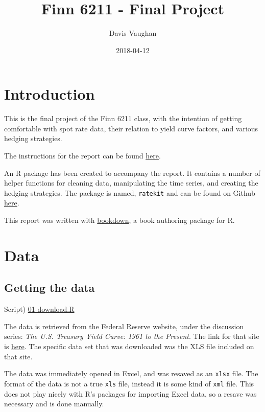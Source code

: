 \documentclass[]{book}
\title{Finn 6211 - Final Project}
\author{Davis Vaughan}
\date{2018-04-12}
\begin{document}
\maketitle

{
\setcounter{tocdepth}{1}
\tableofcontents
}
\hypertarget{titlepage}{%
\chapter{Introduction}\label{titlepage}}

This is the final project of the Finn 6211 class, with the intention of
getting comfortable with spot rate data, their relation to yield curve
factors, and various hedging strategies.

The instructions for the report can be found
\href{./instructions/Hedging_Project_S18.pdf}{here}.

An R package has been created to accompany the report. It contains a
number of helper functions for cleaning data, manipulating the time
series, and creating the hedging strategies. The package is named,
\texttt{ratekit} and can be found on Github \href{}{here}.

This report was written with
\href{https://bookdown.org/yihui/bookdown/}{bookdown}, a book authoring
package for R.

\hypertarget{data}{%
\chapter{Data}\label{data}}

\hypertarget{retrieve}{%
\section{Getting the data}\label{retrieve}}

Script) \href{./R/01-download.R}{01-download.R}

The data is retrieved from the Federal Reserve website, under the
discussion series: \emph{The U.S. Treasury Yield Curve: 1961 to the
Present}. The link for that site is
\href{https://www.federalreserve.gov/pubs/feds/2006/200628/200628abs.html}{here}.
The specific data set that was downloaded was the XLS file included on
that site.

The data was immediately opened in Excel, and was resaved as an
\texttt{xlsx} file. The format of the data is not a true \texttt{xls}
file, instead it is some kind of \texttt{xml} file. This does not play
nicely with R's packages for importing Excel data, so a resave was
necessary and is done manually.
\end{document}
